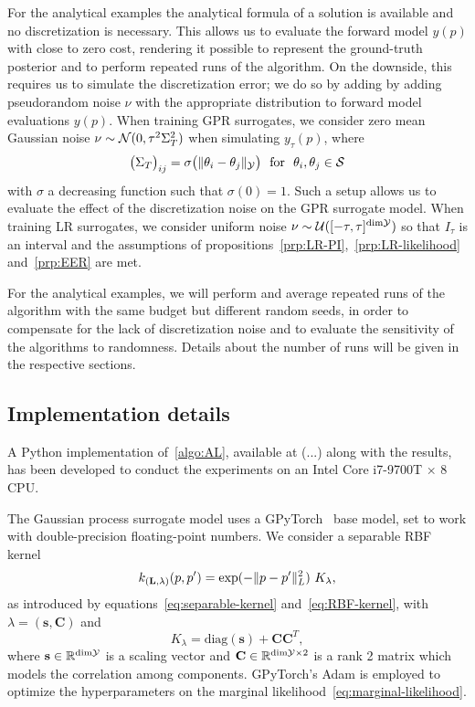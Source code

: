 For the analytical examples the analytical formula of a solution is available and no discretization is necessary.
This allows us to evaluate the forward model $y(p)$ with close to zero cost, rendering it possible to represent the ground-truth posterior and to perform repeated runs of the algorithm. 
On the downside, this requires us to simulate the discretization error; we do so by adding by adding pseudorandom noise $\nu$ with the appropriate distribution to forward model evaluations $y(p)$. \newline
When training GPR surrogates, we consider zero mean Gaussian noise $\nu \sim \mathcal N (0, \tau^2 \Sigma_T^2)$ when simulating $y_\tau(p)$, where \[
\big(\Sigma_T\big)_{ij} = \sigma\big( \|\theta_i - \theta_j\|_{\mathcal Y} \big) \ \text{ for } \ \theta_i, \theta_j \in \mathcal S
\]
with $\sigma$ a decreasing function such that $\sigma(0)=1$.
Such a setup allows us to evaluate the effect of the discretization noise on the GPR surrogate model.\newline
When training LR surrogates, we consider uniform noise $\nu \sim \mathcal U([-\tau, \tau]^{\text{dim} \mathcal Y})$ so that $I_\tau$ is an interval and the assumptions of propositions~\ref{prp:LR-PI},~\ref{prp:LR-likelihood} and~\ref{prp:EER} are met. \medskip 

For the analytical examples, we will perform and average repeated runs of the algorithm with the same budget but different random seeds, in order to compensate for the lack of discretization noise and to evaluate the sensitivity of the algorithms to randomness.
Details about the number of runs will be given in the respective sections. 

\subsection{Implementation details}\label{sec:implementation}
A Python implementation of~\ref{algo:AL}, available at (...) along with the results, has been developed to conduct the experiments on an Intel Core i7-9700T × 8 CPU. \medskip

The Gaussian process surrogate model uses a GPyTorch~\cite{GPyTorchPaper} base model, set to work with double-precision floating-point numbers.
We consider a separable RBF kernel 
\[
    k_{(\mathbf{L}, \lambda)}(p, p') =  \exp ( - \lVert p - p'\rVert^2_{L} ) \ K_\lambda,
\]
as introduced by equations~\eqref{eq:separable-kernel} and~\eqref{eq:RBF-kernel}, with $\lambda = (\mathbf{s}, \mathbf{C}) $ and
\[
K_\lambda = \text{diag}(\mathbf{s}) + \mathbf{CC}^T,
\] 
where $\mathbf{s} \in \mathbb{R}^{\text{dim} \mathcal Y}$ is a scaling vector and $\mathbf{C} \in \mathbb{R}^{\text{dim} \mathcal Y \times 2}$ is a rank 2 matrix which models the correlation among components.
GPyTorch's Adam is employed to optimize the hyperparameters on the marginal likelihood~\eqref{eq:marginal-likelihood}. \medskip

